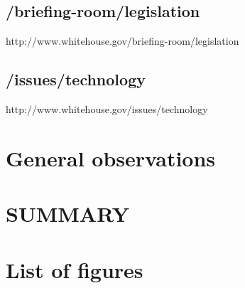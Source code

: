 \documentclass[
12pt, %
a4paper, %
oneside, %
headinclude,footinclude, %
BCOR5mm, %
]{scrartcl}
\begin{document}
	
	\subsection{/briefing-room/legislation}
	http://www.whitehouse.gov/briefing-room/legislation

	\subsection{/issues/technology}
	http://www.whitehouse.gov/issues/technology


\section{General observations}



\section{SUMMARY}



\section{List of figures}







% 


\end{document}
